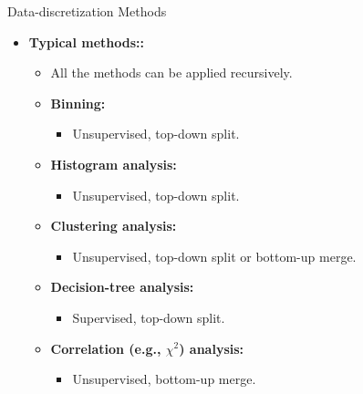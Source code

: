 \documentclass[aspectratio=169,t]{beamer}
\begin{document}
  {
    \begin{frame}{Data-discretization Methods}
    \begin{itemize}
      \item \textbf{Typical methods::}
      \begin{itemize}
        \item All the methods can be applied recursively.
        \item \textbf{Binning:}
              \begin{itemize}
                \item Unsupervised, top-down split.
              \end{itemize}
        \item \textbf{Histogram analysis:}
              \begin{itemize}
                \item Unsupervised, top-down split.
              \end{itemize}
        \item \textbf{Clustering analysis:}
              \begin{itemize}
                \item Unsupervised, top-down split or bottom-up merge.
              \end{itemize}
        \item \textbf{Decision-tree analysis:}
              \begin{itemize}
                \item Supervised, top-down split.
              \end{itemize}
        \item \textbf{Correlation (e.g., $\chi^2$) analysis:}
              \begin{itemize}
                \item Unsupervised, bottom-up merge.
              \end{itemize}
      \end{itemize}
    \end{itemize}
    \end{frame}
  }
\end{document}
